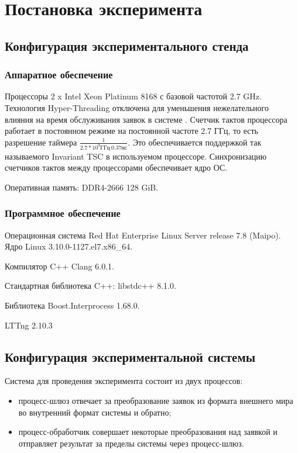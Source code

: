 \section{Постановка эксперимента}

\subsection{Конфигурация экспериментального стенда}

\subsubsection{Аппаратное обеспечение}

Процессоры 2 x Intel Xeon Platinum 8168 с базовой частотой 2.7 GHz.
Технология Hyper-Threading отключена для уменьшения нежелательного влияния на время обслуживания заявок в системе \cite{LowLatencyHT}.
Счетчик тактов процессора работает в постоянном режиме на постоянной частоте 2.7 ГГц, то есть разрешение таймера $\frac{1}{2.7 * 10 ^ 9 \text{ГГц}  ~ 0.37 нс}$. Это обеспечивается поддержкой так называемого Invariant TSC \cite[153]{IntelManual} в используемом процессоре. Синхронизацию счетчиков тактов между процессорами обеспечивает ядро ОС.

Оперативная память: DDR4-2666 128 GiB.

\subsubsection{Программное обеспечение}

Операционная система Red Hat Enterprise Linux Server release 7.8 (Maipo).
Ядро Linux 3.10.0-1127.el7.x86\_64.

Компилятор C++ Clang 6.0.1.

Стандартная библиотека C++: libstdc++ 8.1.0.

Библиотека Boost.Interprocess 1.68.0.

LTTng 2.10.3

\subsection{Конфигурация экспериментальной системы}

Система для проведения эксперимента состоит из двух процессов:
\begin{itemize}
\item процесс-шлюз отвечает за преобразование заявок из формата внешнего мира во внутренний формат системы и обратно;
\item процесс-обработчик совершает некоторые преобразования над заявкой и отправляет результат за пределы системы через процесс-шлюз.
\end{itemize}

